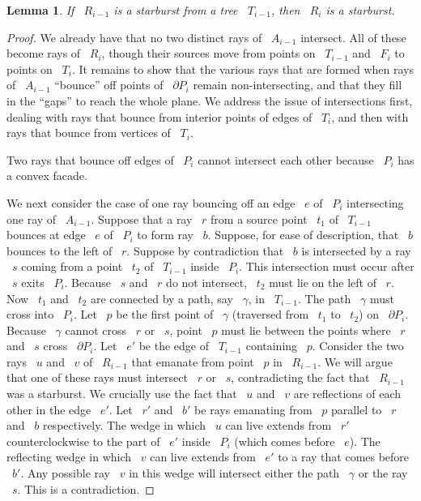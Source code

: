 \documentclass[11pt]{article}
\newtheorem{lemma}{Lemma}
\begin{document}
\begin{lemma}
\label{lem:Ri-starburst}
If ~\(R_{i-1}\) is a starburst from a tree ~\(T_{i-1}\), then ~\(R_i\) is a starburst.
\end{lemma}

\begin{proof}
We already have that no two distinct rays of ~\(A_{i-1}\) intersect.
All of these become rays of ~\(R_i\), though their sources move from points on ~\(T_{i-1}\) and ~\(F_i\) to points on ~\(T_i\).
It remains to show that the various rays that are formed when rays of ~\(A_{i-1}\) ``bounce'' off points of ~\(\partial P_i\) remain non-intersecting, and that they fill in the ``gaps'' to reach the whole plane.
We address the issue of intersections first, dealing with rays that bounce from interior points of edges of ~\(T_i\), and then with rays that bounce from vertices of ~\(T_i\).

Two rays that bounce off edges of ~\(P_i\) cannot intersect each other because ~\(P_i\) has a convex facade.

We next consider the case of one ray bouncing off an edge ~\(e\) of ~\(P_i\) intersecting one ray of ~\(A_{i-1}\).
Suppose that a ray ~\(r\) from a source point ~\(t_1\) of ~\(T_{i-1}\) bounces at edge ~\(e\) of ~\(P_i\) to form ray ~\(b\).
Suppose, for ease of description, that ~\(b\) bounces to the left of ~\(r\).
Suppose by contradiction that ~\(b\) is intersected by a ray ~\(s\) coming from a point ~\(t_2\) of ~\(T_{i-1}\) inside ~\(P_i\).
This intersection must occur after ~\(s\) exits ~\(P_i\).
Because ~\(s\) and ~\(r\) do not intersect, ~\(t_2\) must lie on the left of ~\(r\).
Now ~\(t_1\) and ~\(t_2\) are connected by a path, say ~\(\gamma\), in ~\(T_{i-1}\).
The path ~\(\gamma\) must cross into ~\(P_i\).
Let ~\(p\) be the first point of ~\(\gamma\) (traversed from ~\(t_1\) to ~\(t_2\)) on ~\(\partial P_i\).
Because ~\(\gamma\) cannot cross ~\(r\) or ~\(s\), point ~\(p\) must lie between the points where ~\(r\) and ~\(s\) cross ~\(\partial P_i\).
Let ~\(e'\) be the edge of ~\(T_{i-1}\) containing ~\(p\).
Consider the two rays ~\(u\) and ~\(v\) of ~\(R_{i-1}\) that emanate from point ~\(p\) in ~\(R_{i-1}\).
We will argue that one of these rays must intersect ~\(r\) or ~\(s\), contradicting the fact that ~\(R_{i-1}\) was a starburst.
We crucially use the fact that ~\(u\) and ~\(v\) are reflections of each other in the edge ~\(e'\).
Let ~\(r'\) and ~\(b'\) be rays emanating from ~\(p\) parallel to ~\(r\) and ~\(b\) respectively.
The wedge in which ~\(u\) can live extends from ~\(r'\) counterclockwise to the part of ~\(e'\) inside ~\(P_i\) (which comes before ~\(e\)).
The reflecting wedge in which ~\(v\) can live extends from ~\(e'\) to a ray that comes before ~\(b'\).
Any possible ray ~\(v\) in this wedge will intersect either the path ~\(\gamma\) or the ray ~\(s\).
This is a contradiction.


\end{proof}
\end{document}
